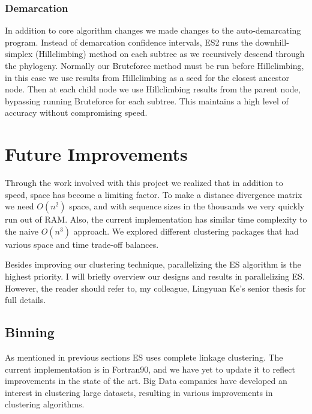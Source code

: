 \subsubsection*{Demarcation}
In addition to core algorithm changes we made changes to the auto-demarcating program.
Instead of demarcation confidence intervals, ES2 runs the downhill-simplex (Hillclimbing) method on each subtree as we recursively descend through the phylogeny.
Normally our Bruteforce method must be run before Hillclimbing, in this case we use results from Hillclimbing as a seed for the closest ancestor node.
Then at each child node we use Hillclimbing results from the parent node, bypassing running Bruteforce for each subtree.
This maintains a high level of accuracy without compromising speed.

\section{Future Improvements}
Through the work involved with this project we realized that in addition to speed, space has become a limiting factor.
To make a distance divergence matrix we need $O(n^2)$ space, and with sequence sizes in the thousands we very quickly run out of RAM. Also, the current implementation has similar time complexity to the naive $O(n^3)$ approach.
We explored different clustering packages that had various space and time trade-off balances.

Besides improving our clustering technique, parallelizing the ES algorithm is the highest priority.
I will briefly overview our designs and results in parallelizing ES.
However, the reader should refer to, my colleague, Lingyuan Ke's senior thesis for full details.
\subsection*{Binning}
As mentioned in previous sections ES uses complete linkage clustering.
The current implementation is in Fortran90, and we have yet to update it to reflect improvements in the state of the art.
Big Data companies have developed an interest in clustering large datasets, resulting in various improvements in clustering algorithms.
